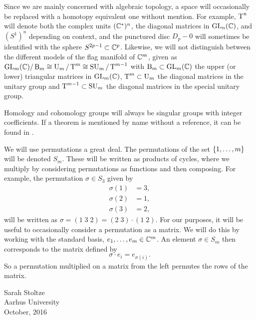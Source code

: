 Since we are mainly concerned with algebraic topology, a space will
occasionally be replaced with a homotopy equivalent one without
mention. For example, $\operatorname{T}^n$ will denote both the complex units
$(\mathbb{C}^*)^n$, the
diagonal matrices in $\operatorname{GL}_n(\mathbb{C})$, and $(S^1)^n$ depending
on context, and
the
punctured disc $D_p-0$ will sometimes be identified with the sphere
$S^{2p-1} \subset \mathbb{C}^p$. Likewise, we will not distinguish between the
different models of the flag manifold of $\mathbb{C}^m$, given as $\operatorname{GL}_{m}(\mathbb{C})/\operatorname{B}_{m}
\cong \operatorname{U}_{m}/\operatorname{T}^{m} \cong \operatorname{SU}_{m}/\operatorname{T}^{m-1}$ with $\operatorname{B}_m \subset \operatorname{GL}_m(\mathbb{C})$ the upper (or
lower) triangular matrices in $\operatorname{GL}_m(\mathbb{C})$, $\operatorname{T}^m \subset \operatorname{U}_m$ the
diagonal
matrices in the unitary group and $\operatorname{T}^{m-1}\subset \operatorname{SU}_m$ the diagonal
matrices in the special unitary group.

Homology and cohomology groups will always be singular groups
with integer coefficients. If a theorem is mentioned by name without a
reference, it can be found in \cite{hatcher}.

We will use permutations a great deal. The permutations of the set
$\left\{ 1,\dots,m \right\}$ will be denoted $S_m$.
These will be written as products of cycles, where we multiply by
considering permutations as functions and then composing. For
example, the
permutation $\sigma\in S_3$ given by
\begin{align*}
  \sigma(1) &= 3, \\
  \sigma(2) &= 1, \\
  \sigma(3) &= 2,
\end{align*}
will be written as $\sigma = (1 \; 3 \; 2) = (2\; 3)\cdot (1\; 2)$.
For our purposes, it will be useful to occasionally consider
a permutation as a matrix. We will do this by working with the
standard
basis, $e_1,\dots,e_m\in \mathbb{C}^m$. An element $\sigma \in S_m$ then
corresponds to the matrix defined by
\[ \sigma \cdot e_i = e_{\sigma(i)}. \]
So a permutation multiplied on a matrix from the left permutes the
rows of the matrix.


\vspace{5em}
\begin{flushright}
  Sarah Stoltze \\
  Aarhus University\\
  October, 2016
\end{flushright}




